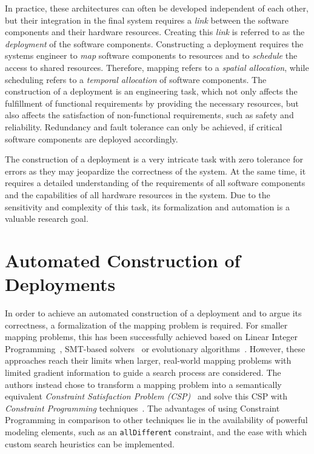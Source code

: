 \documentclass[english,biblatex]{lni}
\begin{document}
In practice, these architectures can often be developed independent of each other, but their integration in the final system requires a \emph{link} between the software components and their hardware resources.     
Creating this \emph{link} is referred to as the \emph{deployment} of the software components.
Constructing a deployment requires the systems engineer to \emph{map} software components to resources and to \emph{schedule} the access to shared resources.
Therefore, mapping refers to a \emph{spatial allocation}, while scheduling refers to a \emph{temporal allocation} of software components.
The construction of a deployment is an engineering task, which not only affects the fulfillment of functional requirements by providing the necessary resources, but also affects the satisfaction of non-functional requirements, such as safety and reliability.
Redundancy and fault tolerance can only be achieved, if critical software components are deployed accordingly.

The construction of a deployment is a very intricate task with zero tolerance for errors as they may jeopardize the correctness of the system.
At the same time, it requires a detailed understanding of the requirements of all software components and the capabilities of all hardware resources in the system.
Due to the sensitivity and complexity of this task, its formalization and automation is a valuable research goal.

\section{Automated Construction of Deployments}

In order to achieve an automated construction of a deployment and to argue its correctness, a formalization of the mapping problem is required.
For smaller mapping problems, this has been successfully achieved based on Linear Integer Programming~\cite{Damm2006, Kugele2009}, SMT-based solvers~\cite{Voss2013} or evolutionary algorithms~\cite{White2011}.
However, these approaches reach their limits when larger, real-world mapping problems with limited gradient information to guide a search process are considered.
The authors instead chose to transform a mapping problem into a semantically equivalent \emph{Constraint Satisfaction Problem (CSP)}~\cite{Apt2003} and solve this CSP with \emph{Constraint Programming} techniques~\cite{Rossi2006}.
The advantages of using Constraint Programming in comparison to other techniques lie in the availability of powerful modeling elements, such as an \texttt{allDifferent} constraint, and the ease with which custom search heuristics can be implemented.
\end{document}

